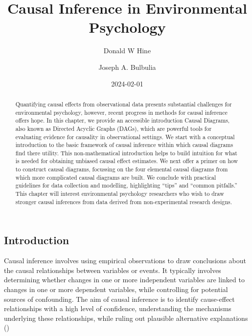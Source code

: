 \documentclass[
  singlecolumn]{article}
\title{Causal Inference in Environmental Psychology}
\author{Donald W Hine \and Joseph A. Bulbulia}
\date{2024-02-01}
\begin{document}
\maketitle
\begin{abstract}
Quantifying causal effects from observational data presents substantial
challenges for environmental psychology, however, recent progress in
methods for causal inference offers hope. In this chapter, we provide an
accessible introduction Causal Diagrams, also known as Directed Acyclic
Graphs (DAGs), which are powerful tools for evaluating evidence for
causality in observational settings. We start with a conceptual
introduction to the basic framework of causal inference within which
causal diagrams find there utility. This non-mathematical introduction
helps to build intuition for what is needed for obtaining unbiased
causal effect estimates. We next offer a primer on how to construct
causal diagrams, focussing on the four elemental causal diagrams from
which more complicated causal diagrams are built. We conclude with
practical guidelines for data collection and modelling, highlighting
``tips'' and ``common pitfalls.'' This chapter will interest
environmental psychology researchers who wish to draw stronger causal
inferences from data derived from non-experimental research designs.
\end{abstract}

\subsection{Introduction}\label{introduction}

Causal inference involves using empirical observations to draw
conclusions about the causal relationships between variables or events.
It typically involves determining whether changes in one or more
independent variables are linked to changes in one or more dependent
variables, while controlling for potential sources of confounding. The
aim of causal inference is to identify cause-effect relationships with a
high level of confidence, understanding the mechanisms underlying these
relationships, while ruling out plausible alternative explanations
()
\end{document}

